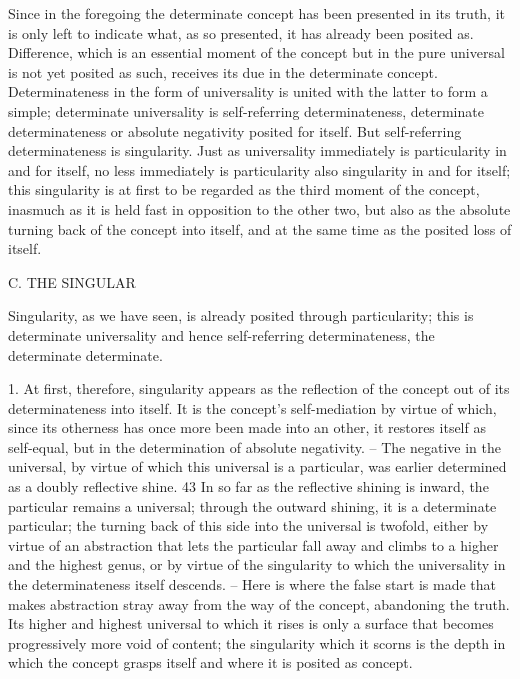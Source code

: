 Since in the foregoing the determinate concept
has been presented in its truth,
it is only left to indicate what, as so presented,
it has already been posited as.
Difference, which is an essential moment of the concept
but in the pure universal is not yet posited as such,
receives its due in the determinate concept.
Determinateness in the form of universality is
united with the latter to form a simple;
determinate universality is self-referring determinateness,
determinate determinateness or absolute negativity
posited for itself.
But self-referring determinateness is singularity.
Just as universality immediately is
particularity in and for itself,
no less immediately is particularity also
singularity in and for itself;
this singularity is at first to be regarded as
the third moment of the concept,
inasmuch as it is held fast
in opposition to the other two,
but also as the absolute turning back
of the concept into itself,
and at the same time
as the posited loss of itself.

C. THE SINGULAR

Singularity, as we have seen, is already posited through particularity; this
is determinate universality and hence self-referring determinateness, the
determinate determinate.

1. At first, therefore, singularity appears as the reflection of the concept out
of its determinateness into itself. It is the concept's self-mediation by virtue of
which, since its otherness has once more been made into an other, it restores
itself as self-equal, but in the determination of absolute negativity. – The
negative in the universal, by virtue of which this universal is a particular,
was earlier determined as a doubly reflective shine. 43 In so far as the reflective
shining is inward, the particular remains a universal; through the outward
shining, it is a determinate particular; the turning back of this side into the
universal is twofold, either by virtue of an abstraction that lets the particular
fall away and climbs to a higher and the highest genus, or by virtue of the
singularity to which the universality in the determinateness itself descends. –
Here is where the false start is made that makes abstraction stray away
from the way of the concept, abandoning the truth. Its higher and highest
universal to which it rises is only a surface that becomes progressively more
void of content; the singularity which it scorns is the depth in which the
concept grasps itself and where it is posited as concept.

